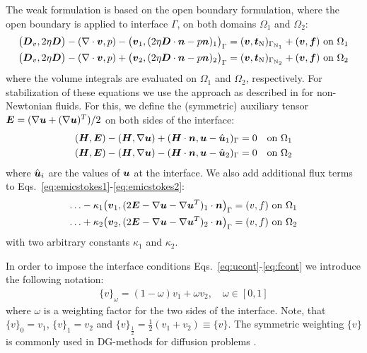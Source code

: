 The weak formulation is based on the open boundary formulation, where the open
boundary is applied to interface $\Gamma$, on both domains $\Omega_1$ and
$\Omega_2$:
\begin{align}
  \big(\boldsymbol{D}_v,2\eta\boldsymbol{D}\big)
    -(\nabla\cdot\boldsymbol{v},p)
    -\big(\boldsymbol{v}_1,(2\eta \boldsymbol{D}\cdot\boldsymbol{n}-p\boldsymbol{n})_1\big)_{\Gamma}&=
(\boldsymbol{v},\boldsymbol{t}_{\text{N}})_{\Gamma_{\text{N}_1}}+(\boldsymbol{v},\boldsymbol{f})
\text{ on }\Omega_1
\label{eq:emicstokes1}\\
  \big(\boldsymbol{D}_v,2\eta\boldsymbol{D}\big)
    -(\nabla\cdot\boldsymbol{v},p)
    +\big(\boldsymbol{v}_2,(2\eta \boldsymbol{D}\cdot\boldsymbol{n}-p\boldsymbol{n})_2\big)_{\Gamma}&=
(\boldsymbol{v},\boldsymbol{t}_{\text{N}})_{\Gamma_{\text{N}_2}}+(\boldsymbol{v},\boldsymbol{f})
\text{ on }\Omega_2
\label{eq:emicstokes2}
\end{align}
where 
the volume integrals are evaluated on $\Omega_1$ and 
$\Omega_2$, respectively. For stabilization of these equations
we use the approach as
described in \cite{Choi11} for non-Newtonian fluids. For this, we define the
(symmetric)
auxiliary tensor $\boldsymbol{E}=(\nabla\boldsymbol{u}+(\nabla\boldsymbol{u})^T)/2$
on both sides of the interface:
\begin{align}
   (\boldsymbol{H},\boldsymbol{E})-(\boldsymbol{H},\nabla\boldsymbol{u}) 
         + (\boldsymbol{H}\cdot\boldsymbol{n},\boldsymbol{u}-\hat{\boldsymbol{u}}_1)_\Gamma =
       0\quad\text{on }\Omega_1 \label{eq:stabstokes1}\\
   (\boldsymbol{H},\boldsymbol{E})-(\boldsymbol{H},\nabla\boldsymbol{u}) 
         - (\boldsymbol{H}\cdot\boldsymbol{n},\boldsymbol{u}-\hat{\boldsymbol{u}}_2)_\Gamma =
       0\quad\text{on }\Omega_2 \label{eq:stabstokes2}
\end{align}
where $\hat{\boldsymbol{u}}_i$ are the values of $\boldsymbol{u}$
at the interface.
We also add additional flux terms to
 Eqs.~\eqref{eq:emicstokes1}-\eqref{eq:emicstokes2}:
\begin{align}
  \ldots -\kappa_1\big(\boldsymbol{v}_1,
       (2\boldsymbol{E} -\nabla \boldsymbol{u}-\nabla\boldsymbol{u}^T)_1\cdot\boldsymbol{n}\big)_{\Gamma}
              &=(v,f)\text{ on }\Omega_1
   \label{eq:stabstokes3}\\
  \ldots +\kappa_2\big(\boldsymbol{v}_2,
       (2\boldsymbol{E} -\nabla \boldsymbol{u}-\nabla\boldsymbol{u}^T)_2\cdot\boldsymbol{n}\big)_{\Gamma}
              &=(v,f)\text{ on }\Omega_2
   \label{eq:stabstokes4}
\end{align}
with two arbitrary constants $\kappa_1$ and $\kappa_2$.

In order to impose the interface conditions
Eqs.~\eqref{eq:ucont}-\eqref{eq:fcont} we introduce the following notation:
\begin{align}
   \{v\}_\omega=(1-\omega)v_1+\omega v_2,\quad \omega\in[0,1]
\end{align}
where $\omega$ is a weighting factor for the two sides of the interface.
Note, that $\{v\}_0=v_1$, $\{v\}_1=v_2$ and
$\{v\}_\frac12=\frac12(v_1+v_2)\equiv\{v\}$. The symmetric weighting $\{v\}$ is
commonly used in DG-methods for diffusion problems \cite{Arnold02}.

